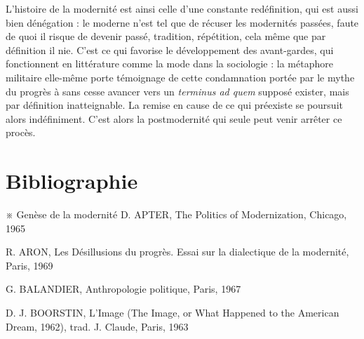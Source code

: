 L'histoire de la modernité est ainsi celle d'une constante redéfinition, qui est aussi bien dénégation : le moderne n'est tel que de récuser les modernités passées, faute de quoi il risque de devenir passé, tradition, répétition, cela même que par définition il nie. C'est ce qui favorise le développement des avant-gardes, qui fonctionnent en littérature comme la mode dans la sociologie : la métaphore militaire elle-même porte témoignage de cette condamnation portée par le mythe du progrès à sans cesse avancer vers un \textit{terminus ad quem}
supposé exister, mais par définition inatteignable. La remise en cause de ce qui préexiste se poursuit alors indéfiniment. C'est alors la postmodernité qui seule peut venir arrêter ce procès.



\section{Bibliographie}



※ Genèse de la modernité
D. APTER, The Politics of Modernization, Chicago, 1965


R. ARON, Les Désillusions du progrès. Essai sur la dialectique de la modernité, Paris, 1969


G. BALANDIER, Anthropologie politique, Paris, 1967


D. J. BOORSTIN, L'Image (The Image, or What Happened to the American Dream, 1962), trad. J. Claude, Paris, 1963
